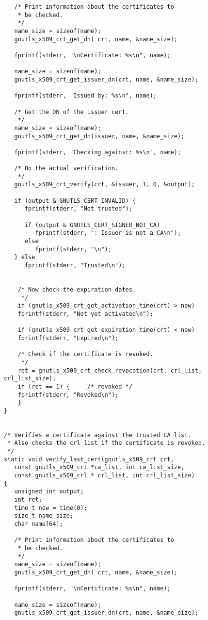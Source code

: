 \begin{verbatim}
   /* Print information about the certificates to
    * be checked.
    */
   name_size = sizeof(name);
   gnutls_x509_crt_get_dn( crt, name, &name_size);

   fprintf(stderr, "\nCertificate: %s\n", name);

   name_size = sizeof(name);
   gnutls_x509_crt_get_issuer_dn(crt, name, &name_size);

   fprintf(stderr, "Issued by: %s\n", name);

   /* Get the DN of the issuer cert.
    */
   name_size = sizeof(name);
   gnutls_x509_crt_get_dn(issuer, name, &name_size);

   fprintf(stderr, "Checking against: %s\n", name);

   /* Do the actual verification.
    */
   gnutls_x509_crt_verify(crt, &issuer, 1, 0, &output);

   if (output & GNUTLS_CERT_INVALID) {
      fprintf(stderr, "Not trusted");

      if (output & GNUTLS_CERT_SIGNER_NOT_CA)
         fprintf(stderr, ": Issuer is not a CA\n");
      else
         fprintf(stderr, "\n");
   } else
      fprintf(stderr, "Trusted\n");


    /* Now check the expiration dates.
     */
    if (gnutls_x509_crt_get_activation_time(crt) > now)
	fprintf(stderr, "Not yet activated\n");

    if (gnutls_x509_crt_get_expiration_time(crt) < now)
	fprintf(stderr, "Expired\n");

    /* Check if the certificate is revoked.
     */
    ret = gnutls_x509_crt_check_revocation(crt, crl_list, crl_list_size);
    if (ret == 1) {		/* revoked */
	fprintf(stderr, "Revoked\n");
    }
}


/* Verifies a certificate against the trusted CA list.
 * Also checks the crl_list if the certificate is revoked.
 */
static void verify_last_cert(gnutls_x509_crt crt,
   const gnutls_x509_crt *ca_list, int ca_list_size,
   const gnutls_x509_crl * crl_list, int crl_list_size)
{ 
   unsigned int output;
   int ret;
   time_t now = time(0);
   size_t name_size;
   char name[64];

   /* Print information about the certificates to
    * be checked.
    */
   name_size = sizeof(name);
   gnutls_x509_crt_get_dn( crt, name, &name_size);

   fprintf(stderr, "\nCertificate: %s\n", name);

   name_size = sizeof(name);
   gnutls_x509_crt_get_issuer_dn(crt, name, &name_size);


\end{verbatim}
